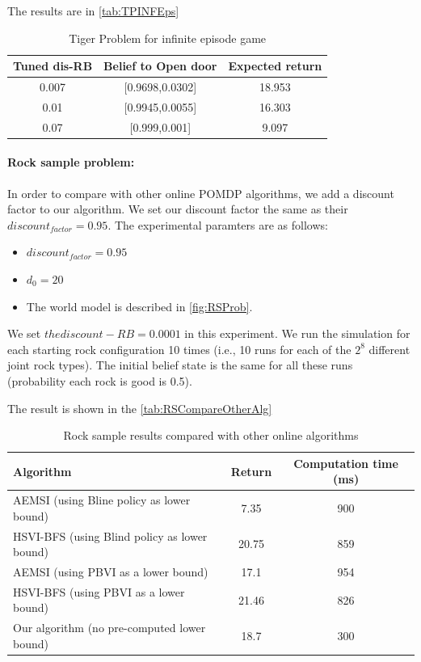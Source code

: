 \documentclass{article}
\begin{document}
The results are in \autoref{tab:TPINFEps}

\begin{table}[H] 
\begin{center}
	\begin{tabular} {| c | c | c |}
	\hline \hline
	Tuned dis-RB & Belief to Open door & Expected return \\
	\hline
	0.007 & [0.9698,0.0302] & 18.953 \\
	\hline
	0.01 & [0.9945,0.0055] & 16.303 \\
	\hline 
	0.07 & [0.999,0.001] & 9.097 \\
	\hline \hline
	\end{tabular}
\end{center}
\caption{Tiger Problem for infinite episode game}
\label{tab:TPINFEps}
\end{table}


\paragraph{Rock sample problem:} In order to compare with other online POMDP algorithms,
we add a discount factor to our algorithm. We set our discount factor the same as their 
$discount_{factor}=0.95$. The experimental paramters are as follows:
\begin{itemize}
\item $discount_{factor}=0.95$
\item $d_0=20$
\item The world model is described in \autoref{fig:RSProb}.
\end{itemize}

We set $the discount-RB=0.0001$ in this experiment. We run the simulation for each starting rock
configuration 10 times (i.e., 10 runs for each of the $2^8$ different joint rock types). The
initial belief state is the same for all these runs (probability each rock is good is 0.5).

The result is shown in the \autoref{tab:RSCompareOtherAlg}

\begin{table}[H]
\begin{center}
	\begin{tabular} {| l | c | c |}
		\hline \hline
		Algorithm & Return & Computation time (ms) \\
		\hline
		AEMSI (using Bline policy as lower bound) & 7.35 & 900 \\
		\hline
		HSVI-BFS (using Blind policy as lower bound) & 20.75 & 859 \\
		\hline
		AEMSI (using PBVI as a lower bound) & 17.1 & 954 \\
		\hline
		HSVI-BFS (using PBVI as a lower bound) & 21.46 & 826 \\
		\hline
		Our algorithm (no pre-computed lower bound) & 18.7 & 300 \\
		\hline \hline
	\end{tabular}
\end{center}
\caption{Rock sample results compared with other online algorithms}
\label{tab:RSCompareOtherAlg}
\end{table}
\end{document}
